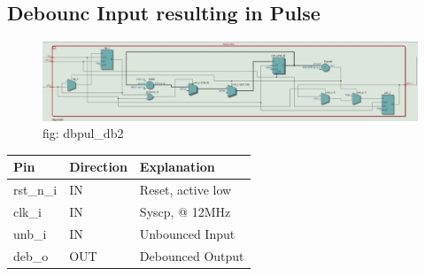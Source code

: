 \documentclass[12pt,a4 paper] {article}
\begin{document}
\subsection{Debounc Input resulting in Pulse}
\begin{figure}[h]
	\centering	
	\includegraphics[scale=0.3]{../png/dbpul_db2.png}
	\newline
	fig: dbpul\_db2\\
\end{figure}
\begin{center}
	\begin{tabular}{| p{2cm} | p{2cm} | p{4cm} |}
		\hline
		Pin & Direction  & Explanation\\
		\hline	
  		rst\_n\_i & IN &  Reset, active low\\
  		\hline
		clk\_i   & IN   &  Syscp, @ 12MHz\\
		\hline
		unb\_i   & IN   & Unbounced Input\\
		\hline
		deb\_o   & OUT & Debounced Output \\
		\hline
		
	\end{tabular}
\end{center}
\newpage
\end{document}
